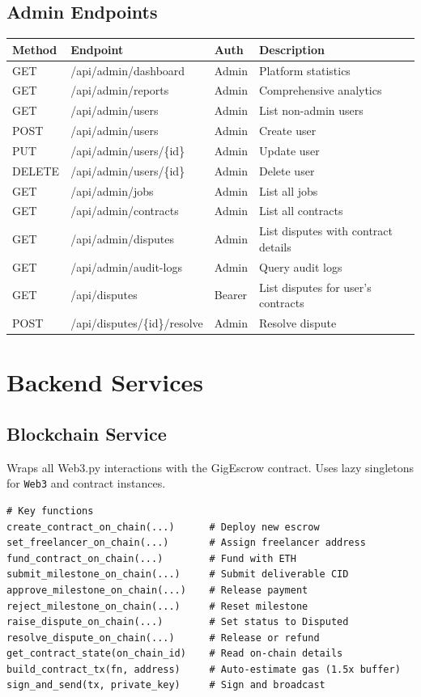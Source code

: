 \documentclass[12pt,a4paper]{article}
\begin{document}
\subsection{Admin Endpoints}

\begin{longtable}{lllX}
\toprule
\textbf{Method} & \textbf{Endpoint} & \textbf{Auth} & \textbf{Description} \\
\midrule
\endhead
GET & /api/admin/dashboard & Admin & Platform statistics \\
GET & /api/admin/reports & Admin & Comprehensive analytics \\
GET & /api/admin/users & Admin & List non-admin users \\
POST & /api/admin/users & Admin & Create user \\
PUT & /api/admin/users/\{id\} & Admin & Update user \\
DELETE & /api/admin/users/\{id\} & Admin & Delete user \\
GET & /api/admin/jobs & Admin & List all jobs \\
GET & /api/admin/contracts & Admin & List all contracts \\
GET & /api/admin/disputes & Admin & List disputes with contract details \\
GET & /api/admin/audit-logs & Admin & Query audit logs \\
GET & /api/disputes & Bearer & List disputes for user's contracts \\
POST & /api/disputes/\{id\}/resolve & Admin & Resolve dispute \\
\bottomrule
\end{longtable}

\section{Backend Services}

\subsection{Blockchain Service}
Wraps all Web3.py interactions with the GigEscrow contract. Uses lazy singletons for \texttt{Web3} and contract instances.

\begin{lstlisting}[style=pythonstyle]
# Key functions
create_contract_on_chain(...)      # Deploy new escrow
set_freelancer_on_chain(...)       # Assign freelancer address
fund_contract_on_chain(...)        # Fund with ETH
submit_milestone_on_chain(...)     # Submit deliverable CID
approve_milestone_on_chain(...)    # Release payment
reject_milestone_on_chain(...)     # Reset milestone
raise_dispute_on_chain(...)        # Set status to Disputed
resolve_dispute_on_chain(...)      # Release or refund
get_contract_state(on_chain_id)    # Read on-chain details
build_contract_tx(fn, address)     # Auto-estimate gas (1.5x buffer)
sign_and_send(tx, private_key)     # Sign and broadcast
\end{lstlisting}
\end{document}
